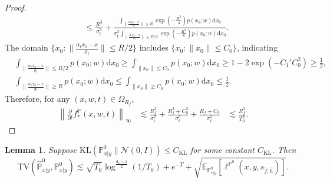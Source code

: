 \documentclass{article}
\numberwithin{equation}{section}
\newcommand{\E}{\mathbb{E}}
\newcommand{\dif}{\mathrm{d}}
\newtheorem{lemma}[thm]{Lemma}
\theoremstyle{definition}
\renewcommand{\P}{\mathbb{P}}
\begin{document}
\begin{proof}
\begin{equation}
\begin{aligned}
            &\leq \frac{R^3}{\sigma_t^3} + \frac{\int_{\|\frac{\alpha_tx_0-x}{\sigma_t}\|\geq R} \exp(-\frac{R^2}{4})p(x_0;w)\dif x_0}{\sigma_t^3\int_{\|\frac{\alpha_tx_0-x}{\sigma_t}\|\leq R/2} \exp(-\frac{R^2}{8})p(x_0;w)\dif x_0}.
        \end{aligned}
    \end{equation}
    The domain $\Big\{x_0:\|\frac{\alpha_tx_0-x}{\sigma_t}\|\leq R/2\Big\}$ includes $\Big\{x_0:\|x_0\|\leq C_0\Big\}$, indicating
    \begin{equation}
        \begin{aligned}
            &\int_{\|\frac{\alpha_tx_0-x}{\sigma_t}\|\leq R/2} p(x_0;w)\dif x_0\geq  \int_{\|x_0\|\leq C_0} p(x_0;w)\dif x_0 \geq 1-2\exp(-C_1'C_0^2)\geq \frac{1}{2},\\
            &\int_{\|\frac{\alpha_tx_0-x}{\sigma_t}\|\geq R} p(x_0;w)\dif x_0\leq  \int_{\|x_0\|\geq C_0} p(x_0;w)\dif x_0 \leq \frac{1}{2}.
        \end{aligned}
    \end{equation}
    Therefore, for any $(x,w,t)\in\Omega_{R_f}$,
    \begin{equation}
        \begin{aligned}
            \left\|\frac{\partial}{\partial t}f_*^\P(x,w,t)\right\|_\infty
            &\lesssim \frac{R_f^2}{\sigma_t^2}+\frac{R_f^3+C_0^3}{\sigma_t^6}+\frac{R_f+C_0}{\sigma_t^3}
            &\lesssim \frac{R_f^3}{T_0^3}.
        \end{aligned}
    \end{equation}
\end{proof}


\begin{lemma}\label{lem:TV_bound}
    Suppose $\mathrm{KL}(\P^0_{x|y}\|\mathcal{N}(0,I))\leq C_{\mathrm{KL}}$ for some constant $C_{\mathrm{KL}}$. Then
    \begin{equation}
        \mathrm{TV}(\widehat{\P}^0_{x|y},\P^0_{x|y})\lesssim \sqrt{T_0}\log^{\frac{d_x+1}{2}}(1/T_0) + e^{-T} + \sqrt{\E_{\P^0_{x|y}}[\ell^{\P^0}(x,y,s_{\widehat{f},\widehat{h}})]}.
    \end{equation}
\end{lemma}
\end{document}
